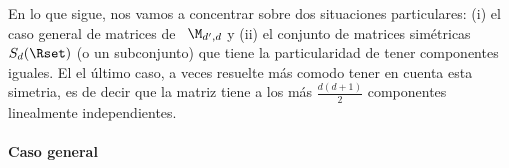 En lo que sigue, nos vamos  a concentrar sobre dos situaciones particulares: (i)
el  caso general de  matrices de  \ $\M_{d',d}$  y (ii)  el conjunto  de matrices
sim\'etricas  $S_d(\Rset)$ (o  un subconjunto)  que tiene  la  particularidad de
tener componentes  iguales. El el \'ultimo  caso, a veces  resuelte m\'as comodo
tener en  cuenta esta  simetria, es  de decir que  la matriz  tiene a  los m\'as
$\frac{d (d+1)}{2}$ componentes linealmente independientes.




\paragraph{Caso general}

